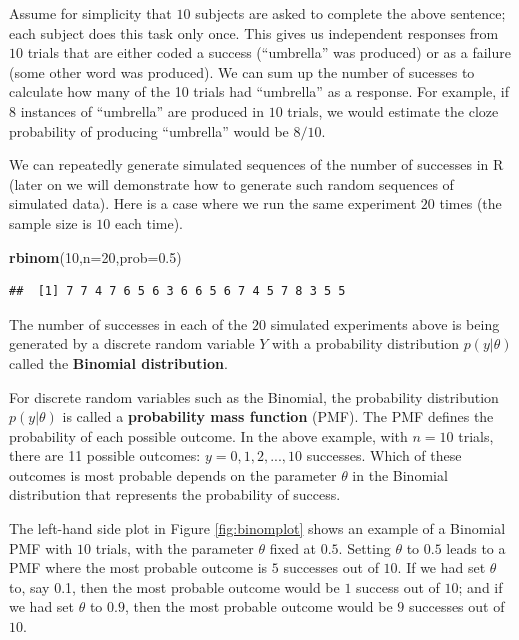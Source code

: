 \documentclass[12pt,]{krantz}
\newenvironment{Shaded}{\begin{snugshade}}{\end{snugshade}}
\newcommand{\KeywordTok}[1]{\textcolor[rgb]{0.13,0.29,0.53}{\textbf{#1}}}
\newcommand{\DataTypeTok}[1]{\textcolor[rgb]{0.13,0.29,0.53}{#1}}
\newcommand{\DecValTok}[1]{\textcolor[rgb]{0.00,0.00,0.81}{#1}}
\newcommand{\FloatTok}[1]{\textcolor[rgb]{0.00,0.00,0.81}{#1}}
\newcommand{\NormalTok}[1]{#1}
\theoremstyle{definition}
\theoremstyle{definition}
\theoremstyle{definition}
\theoremstyle{remark}
\begin{document}
Assume for simplicity that \(10\) subjects are asked to complete the
above sentence; each subject does this task only once. This gives us
independent responses from \(10\) trials that are either coded a success
(``umbrella'' was produced) or as a failure (some other word was
produced). We can sum up the number of sucesses to calculate how many of
the 10 trials had ``umbrella'' as a response. For example, if \(8\)
instances of ``umbrella'' are produced in \(10\) trials, we would
estimate the cloze probability of producing ``umbrella'' would be
\(8/10\).

We can repeatedly generate simulated sequences of the number of
successes in R (later on we will demonstrate how to generate such random
sequences of simulated data). Here is a case where we run the same
experiment \(20\) times (the sample size is \(10\) each time).

\begin{Shaded}
\begin{Highlighting}[]
\KeywordTok{rbinom}\NormalTok{(}\DecValTok{10}\NormalTok{,}\DataTypeTok{n=}\DecValTok{20}\NormalTok{,}\DataTypeTok{prob=}\FloatTok{0.5}\NormalTok{)}
\end{Highlighting}
\end{Shaded}

\begin{verbatim}
##  [1] 7 7 4 7 6 5 6 3 6 6 5 6 7 4 5 7 8 3 5 5
\end{verbatim}

The number of successes in each of the \(20\) simulated experiments
above is being generated by a discrete random variable \(Y\) with a
probability distribution \(p(y|\theta)\) called the \textbf{Binomial
distribution}.

For discrete random variables such as the Binomial, the probability
distribution \(p(y|\theta)\) is called a \textbf{probability mass
function} (PMF). The PMF defines the probability of each possible
outcome. In the above example, with \(n=10\) trials, there are 11
possible outcomes: \(y=0,1,2,...,10\) successes. Which of these outcomes
is most probable depends on the parameter \(\theta\) in the Binomial
distribution that represents the probability of success.

The left-hand side plot in Figure \ref{fig:binomplot} shows an example
of a Binomial PMF with \(10\) trials, with the parameter \(\theta\)
fixed at \(0.5\). Setting \(\theta\) to \(0.5\) leads to a PMF where the
most probable outcome is \(5\) successes out of \(10\). If we had set
\(\theta\) to, say 0.1, then the most probable outcome would be \(1\)
success out of \(10\); and if we had set \(\theta\) to \(0.9\), then the
most probable outcome would be \(9\) successes out of \(10\).
\end{document}
